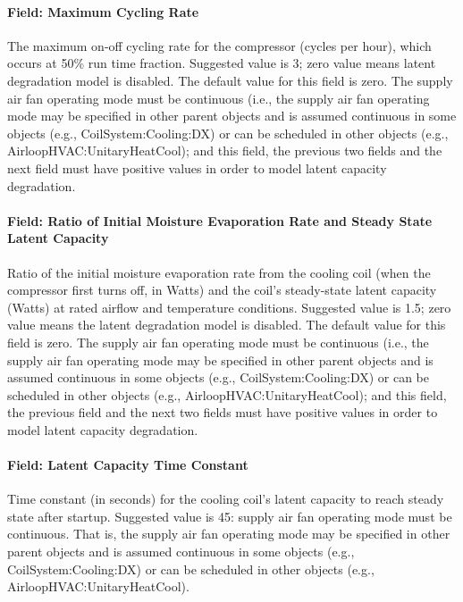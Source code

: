 \paragraph{Field: Maximum Cycling Rate}\label{field-maximum-cycling-rate}

The maximum on-off cycling rate for the compressor (cycles per hour), which occurs at 50\% run time fraction. Suggested value is 3; zero value means latent degradation model is disabled. The default value for this field is zero. The supply air fan operating mode must be continuous (i.e., the supply air fan operating mode may be specified in other parent objects and is assumed continuous in some objects (e.g., CoilSystem:Cooling:DX) or can be scheduled in other objects (e.g., AirloopHVAC:UnitaryHeatCool); and this field, the previous two fields and the next field must have positive values in order to model latent capacity degradation.

\paragraph{Field: Ratio of Initial Moisture Evaporation Rate and Steady State Latent Capacity}\label{field-ratio-of-initial-moisture-evaporation-rate-and-steady-state-latent-capacity}

Ratio of the initial moisture evaporation rate from the cooling coil (when the compressor first turns off, in Watts) and the coil's steady-state latent capacity (Watts) at rated airflow and temperature conditions. Suggested value is 1.5; zero value means the latent degradation model is disabled. The default value for this field is zero. The supply air fan operating mode must be continuous (i.e., the supply air fan operating mode may be specified in other parent objects and is assumed continuous in some objects (e.g., CoilSystem:Cooling:DX) or can be scheduled in other objects (e.g., AirloopHVAC:UnitaryHeatCool); and this field, the previous field and the next two fields must have positive values in order to model latent capacity degradation.

\paragraph{Field: Latent Capacity Time Constant}\label{field-latent-capacity-time-constant}

Time constant (in seconds) for the cooling coil's latent capacity to reach steady state after startup. Suggested value is 45: supply air fan operating mode must be continuous. That is, the supply air fan operating mode may be specified in other parent objects and is assumed continuous in some objects (e.g., CoilSystem:Cooling:DX) or can be scheduled in other objects (e.g., AirloopHVAC:UnitaryHeatCool).

